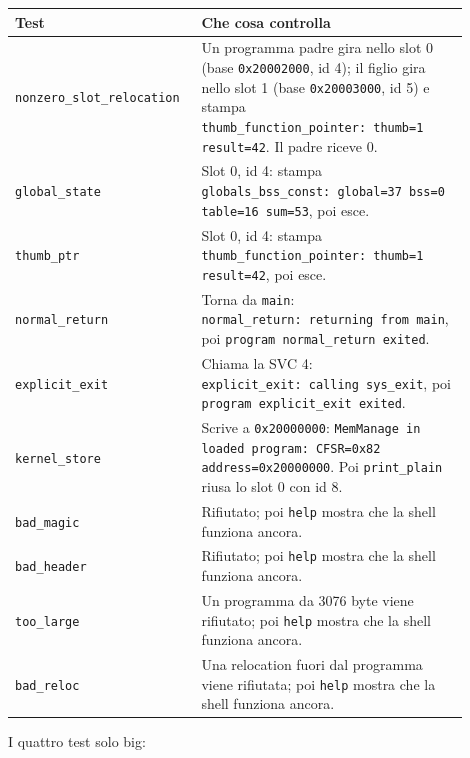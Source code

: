 \begin{center}
\small
\begin{tabular}{|p{0.33\linewidth}|p{0.57\linewidth}|}
\hline
\raggedright Test & \raggedright Che cosa controlla \tabularnewline
\hline\hline
\raggedright \texttt{nonzero\_\allowbreak slot\_\allowbreak relocation} & \raggedright Un programma padre gira nello slot 0 (base \texttt{0x20002000}, id 4); il figlio gira nello slot 1 (base \texttt{0x20003000}, id 5) e stampa \texttt{thumb\_function\_pointer:\ thumb=1 result=42}. Il padre riceve 0. \tabularnewline
\hline
\raggedright \texttt{global\_state} & \raggedright Slot 0, id 4: stampa \texttt{globals\_bss\_const:\ global=37 bss=0 table=16 sum=53}, poi esce. \tabularnewline
\hline
\raggedright \texttt{thumb\_ptr} & \raggedright Slot 0, id 4: stampa \texttt{thumb\_function\_pointer:\ thumb=1 result=42}, poi esce. \tabularnewline
\hline
\raggedright \texttt{normal\_return} & \raggedright Torna da \texttt{main}: \texttt{normal\_return:\ returning from main}, poi \texttt{program normal\_return exited}. \tabularnewline
\hline
\raggedright \texttt{explicit\_exit} & \raggedright Chiama la SVC 4: \texttt{explicit\_exit:\ calling sys\_exit}, poi \texttt{program explicit\_exit exited}. \tabularnewline
\hline
\raggedright \texttt{kernel\_store} & \raggedright Scrive a \texttt{0x20000000}: \texttt{MemManage in loaded program:\ CFSR=0x82 address=0x20000000}. Poi \texttt{print\_plain} riusa lo slot 0 con id 8. \tabularnewline
\hline
\raggedright \texttt{bad\_magic} & \raggedright Rifiutato; poi \texttt{help} mostra che la shell funziona ancora. \tabularnewline
\hline
\raggedright \texttt{bad\_header} & \raggedright Rifiutato; poi \texttt{help} mostra che la shell funziona ancora. \tabularnewline
\hline
\raggedright \texttt{too\_large} & \raggedright Un programma da 3076 byte viene rifiutato; poi \texttt{help} mostra che la shell funziona ancora. \tabularnewline
\hline
\raggedright \texttt{bad\_reloc} & \raggedright Una relocation fuori dal programma viene rifiutata; poi \texttt{help} mostra che la shell funziona ancora. \tabularnewline
\hline
\end{tabular}
\end{center}

I quattro test solo big:

